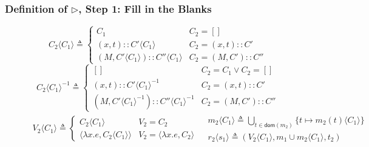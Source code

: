 \documentclass{beamer}
\newcommand*{\cons}{::}
\newcommand*{\mem}{m}
\newcommand*{\inject}[2]{{#2}\langle{#1}\rangle}
\newcommand*{\delete}[2]{{#2}{\langle{#1}\rangle}^{-1}}
\begin{document}
\begin{frame}[c]
  \frametitle{Definition of $\rhd$, Step 1: Fill in the Blanks}
  \begin{figure}[h!]
    \footnotesize
    \[
      \inject{C_{1}}{C_{2}}\triangleq
      \begin{cases}
        C_1                                             & C_{2}=[]              \\
        (x, t)\cons\inject{C_{1}}{C'}                   & C_{2}=(x,t)\cons C'   \\
        (M, \inject{C_{1}}{C'})\cons\inject{C_{1}}{C''} & C_{2}=(M,C')\cons C''
      \end{cases}
    \]
    \[
      \delete{C_{1}}{C_{2}}\triangleq
      \begin{cases}
        []                                              & C_{2}=C_{1}\lor C_{2}=[] \\
        (x,t)\cons\delete{C_{1}}{C'}                    & C_{2}=(x,t)\cons C'      \\
        (M, \delete{C_{1}}{C'})\cons\delete{C_{1}}{C''} & C_{2}=(M, C')\cons C''
      \end{cases}
    \]\pause
    \[
      \begin{array}{cc}
        \inject{C_1}{V_2}\triangleq
        \begin{cases}
          \inject{C_1}{C_2}                           & V_2=C_2                            \\
          \langle\lambda x.e,\inject{C_1}{C_2}\rangle & V_2=\langle\lambda x.e, C_2\rangle
        \end{cases} &
        \begin{array}{l}
          \inject{C_1}{\mem_2}\triangleq
          \displaystyle\bigcup_{t\in\mathsf{dom}(\mem_2)}\{t\mapsto\inject{C_1}{\mem_2(t)}\} \\
          \inject{s_1}{r_2}\triangleq
          (\inject{C_1}{V_2},\mem_1\cup\inject{C_1}{\mem_2},t_2)
        \end{array}
      \end{array}
    \]
  \end{figure}
\end{frame}
\end{document}
